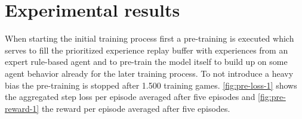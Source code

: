 \section{Experimental results} \label{experimental_results}


When starting the initial training process first a pre-training is executed which serves to fill the prioritized experience replay buffer with experiences from an expert rule-based agent and to pre-train the model itself to build up on some agent behavior already for the later training process. To not introduce a heavy bias the pre-training is stopped after 1.500 training games. \autoref{fig:pre-loss-1} shows the aggregated step loss per episode averaged after five episodes and \autoref{fig:pre-reward-1} the reward per episode averaged after five episodes.

